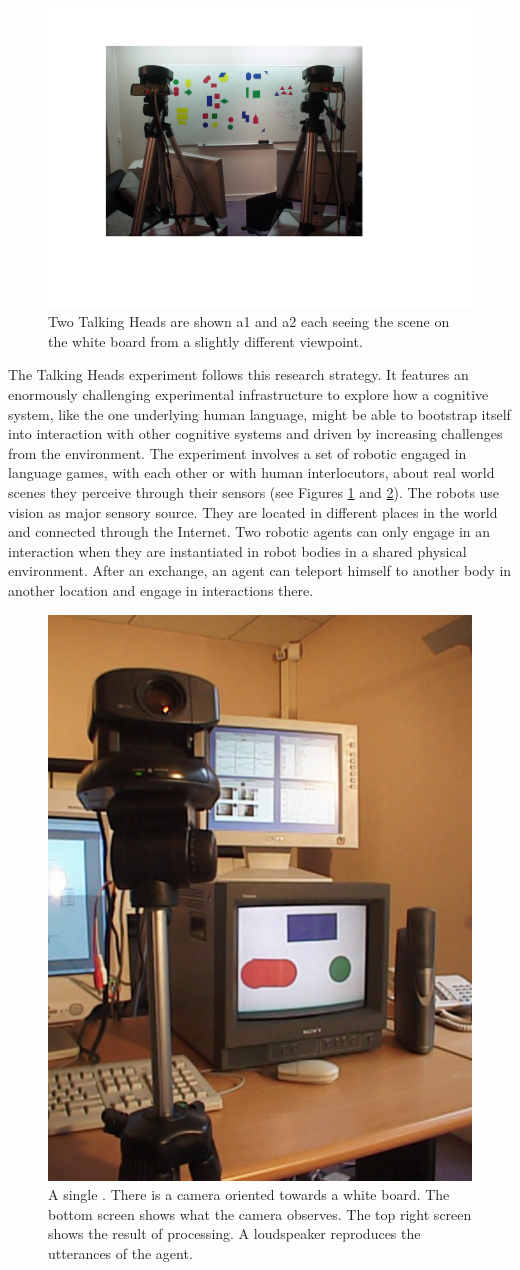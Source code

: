\begin{figure}[htbp]
  \centerline{\includegraphics[width=.65\textwidth]{./chap1/figs/heads.pdf}}
\caption{Two Talking Heads are shown {\bfshape a1} and 
{\bfshape a2} each seeing the scene on the white board from a slightly different viewpoint.}
\label{f:plate1}
\end{figure}

The Talking Heads experiment follows this research strategy.  
It features an enormously challenging experimental
infrastructure to explore how a cognitive
system, like the one underlying human language, might
be able to bootstrap itself into interaction 
with other cognitive systems and driven by increasing
challenges from the environment. The experiment
involves a set of robotic  engaged in language
games, with each other or with human interlocutors, 
about real world scenes they perceive through their sensors
(see Figures \ref{f:plate1} and \ref{f:plate2}).
The robots use vision as major sensory source. They are located in
different places in the world and connected through the Internet. 
Two robotic agents can only engage in an interaction when they 
are instantiated in robot bodies in a shared physical environment. 
After an exchange, an agent can teleport himself to another body in 
another location and engage in interactions there. 


\begin{figure}[htbp]
  \centerline{\includegraphics[width=.40\textwidth]{./chap1/figs/head.pdf}}
\caption{A single . There is a camera oriented towards a
white board. The bottom screen shows what the camera observes. The top right screen shows the result of processing.
A loudspeaker reproduces the utterances of the agent. }
\label{f:plate2}
\end{figure}

